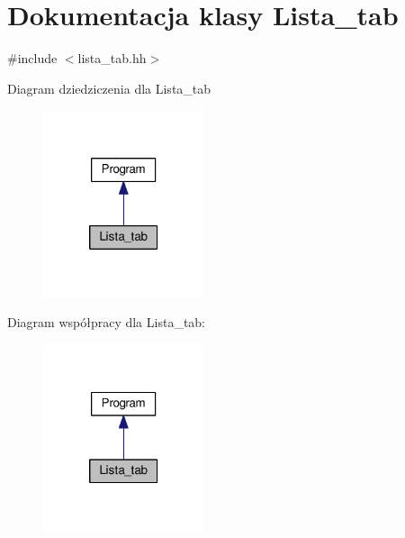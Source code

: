 \hypertarget{class_lista__tab}{\section{Dokumentacja klasy Lista\-\_\-tab}
\label{class_lista__tab}
}


{\ttfamily \#include $<$lista\-\_\-tab.\-hh$>$}



Diagram dziedziczenia dla Lista\-\_\-tab
\nopagebreak
\begin{figure}[H]
\begin{center}
\leavevmode
\includegraphics[width=134pt]{class_lista__tab__inherit__graph}
\end{center}
\end{figure}


Diagram współpracy dla Lista\-\_\-tab\-:
\nopagebreak
\begin{figure}[H]
\begin{center}
\leavevmode
\includegraphics[width=134pt]{class_lista__tab__coll__graph}
\end{center}
\end{figure}

